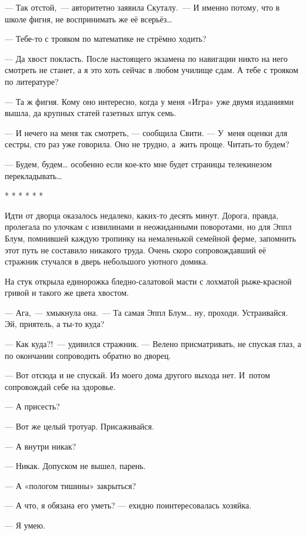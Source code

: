 \documentclass[fontsize=11pt,a5paper,titlepage=firstcover]{scrbook}
\begin{document}
--- Так отстой,~--- авторитетно заявила Скуталу.~--- И именно потому, что в школе фигня, не воспринимать же её всерьёз{\ldots}

--- Тебе-то с трояком по математике не стрёмно ходить?

--- Да хвост покласть. После настоящего экзамена по навигации никто на него смотреть не станет, а я это хоть сейчас в любом училище сдам. А тебе с трояком по литературе?

--- Та ж фигня. Кому оно интересно, когда у меня «Игра» уже двумя изданиями вышла, да крупных статей газетных штук семь.

--- И нечего на меня так смотреть, --- сообщила Свити. --- У~меня оценки для сестры, сто раз уже говорила. Оно не трудно, а~жить проще. Читать-то будем?

--- Будем, будем{\ldots} особенно если кое-кто мне будет страницы телекинезом перекладывать{\ldots}
\begin{center}* * * * * *\end{center}

Идти от дворца оказалось недалеко, каких-то десять минут. Дорога, правда, пролегала по улочкам с извилинами и неожиданными поворотами, но для Эппл Блум, помнившей каждую тропинку на немаленькой семейной ферме, запомнить этот путь не составило никакого труда. Очень скоро сопровождавший её стражник стучался в дверь небольшого уютного домика.

На стук открыла единорожка бледно-салатовой масти с лохматой рыже-красной гривой и такого же цвета хвостом.

--- Ага,~--- хмыкнула она.~--- Та самая Эппл Блум{\ldots} ну, проходи. Устраивайся. Эй, приятель, а ты-то куда?

--- Как куда?!~--- удивился стражник. --- Велено присматривать, не спуская глаз, а по окончании сопроводить обратно во дворец.

--- Вот отсюда и не спускай. Из моего дома другого выхода нет. И~потом сопровождай себе на здоровье.

--- А присесть?

--- Вот же целый тротуар. Присаживайся.

--- А внутри никак?

--- Никак. Допуском не вышел, парень.

--- А «пологом тишины» закрыться?

--- А что, я обязана его уметь? --- ехидно поинтересовалась хозяйка.

--- Я умею.
\end{document}
